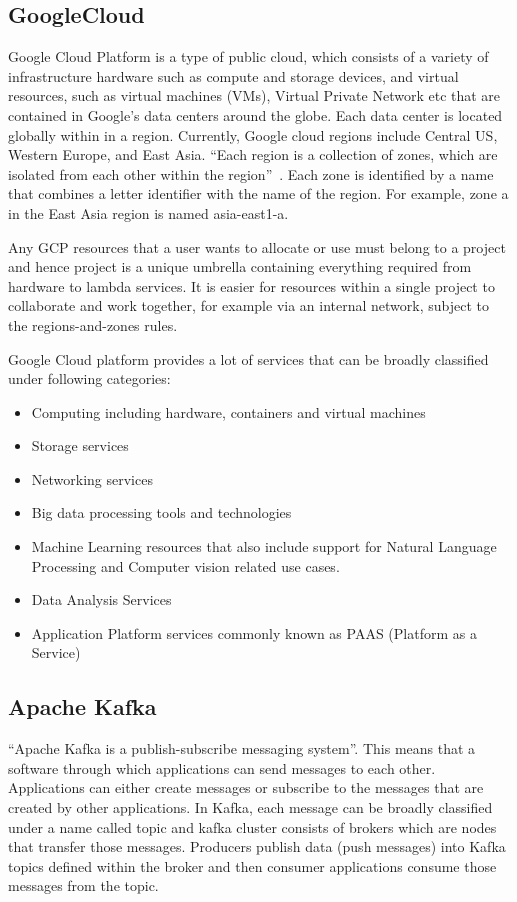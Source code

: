 \subsection{GoogleCloud}

Google Cloud Platform is a type of public cloud, which consists of a
variety of infrastructure hardware such as compute and storage
devices, and virtual resources, such as virtual machines (VMs),
Virtual Private Network etc that are contained in Google's data
centers around the globe. Each data center is located globally within
in a region. Currently, Google cloud regions include Central US,
Western Europe, and East Asia. ``Each region is a collection of zones,
which are isolated from each other within the
region''~\cite{hid-sp18-510-gcp}. Each zone is identified by a name
that combines a letter identifier with the name of the region. For
example, zone a in the East Asia region is named asia-east1-a.

Any GCP resources that a user wants to allocate or use must belong to
a project and hence project is a unique umbrella containing everything
required from hardware to lambda services. It is easier for resources
within a single project to collaborate and work together, for example
via an internal network, subject to the regions-and-zones rules.

Google Cloud platform provides a lot of services that can be broadly
classified under following categories:

\begin{itemize}
	\item Computing including hardware, containers and virtual machines
	\item Storage services
	\item Networking services
	\item Big data processing tools and technologies
	\item Machine Learning resources that also include support for
    Natural Language Processing and Computer vision related use cases.
	\item Data Analysis Services
	\item Application Platform services commonly known as PAAS (Platform
    as a Service)
\end{itemize}

\subsection{Apache Kafka}

``Apache Kafka is a publish-subscribe messaging
system''\cite{hid-sp18-510-kafka}. This means that a software through
which applications can send messages to each other. Applications can
either create messages or subscribe to the messages that are created
by other applications.  In Kafka, each message can be broadly
classified under a name called topic and kafka cluster consists of
brokers which are nodes that transfer those messages. Producers
publish data (push messages) into Kafka topics defined within the
broker and then consumer applications consume those messages from the
topic.

